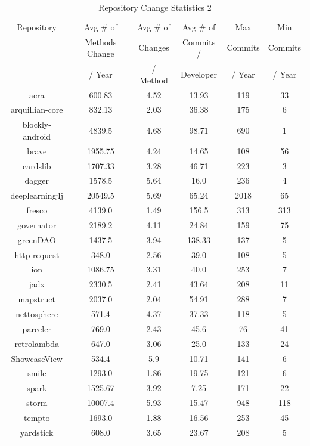 \begin{table}
\begin{center}
    \begin{tabular}{|c|c|c|c|c|c|}
        \hline
        Repository & Avg \# of & Avg \# of & Avg \# of & Max & Min \\
         & Methods Change & Changes & Commits / & Commits & Commits \\
         & / Year & / Method & Developer & / Year & / Year \\
        \hline
        acra & 600.83 & 4.52 & 13.93 & 119 & 33 \\
        arquillian-core & 832.13 & 2.03 & 36.38 & 175 & 6 \\
        blockly-android & 4839.5 & 4.68 & 98.71 & 690 & 1 \\
        brave & 1955.75 & 4.24 & 14.65 & 108 & 56 \\
        cardslib & 1707.33 & 3.28 & 46.71 & 223 & 3 \\
        dagger & 1578.5 & 5.64 & 16.0 & 236 & 4 \\
        deeplearning4j & 20549.5 & 5.69 & 65.24 & 2018 & 65 \\
        fresco & 4139.0 & 1.49 & 156.5 & 313 & 313 \\
        governator & 2189.2 & 4.11 & 24.84 & 159 & 75 \\
        greenDAO & 1437.5 & 3.94 & 138.33 & 137 & 5 \\
        http-request & 348.0 & 2.56 & 39.0 & 108 & 5 \\
        ion & 1086.75 & 3.31 & 40.0 & 253 & 7 \\
        jadx & 2330.5 & 2.41 & 43.64 & 208 & 11 \\
        mapstruct & 2037.0 & 2.04 & 54.91 & 288 & 7 \\
        nettosphere & 571.4 & 4.37 & 37.33 & 118 & 5 \\
        parceler & 769.0 & 2.43 & 45.6 & 76 & 41 \\
        retrolambda & 647.0 & 3.06 & 25.0 & 133 & 24 \\
        ShowcaseView & 534.4 & 5.9 & 10.71 & 141 & 6 \\
        smile & 1293.0 & 1.86 & 19.75 & 121 & 6 \\
        spark & 1525.67 & 3.92 & 7.25 & 171 & 22 \\
        storm & 10007.4 & 5.93 & 15.47 & 948 & 118 \\
        tempto & 1693.0 & 1.88 & 16.56 & 253 & 45 \\
        yardstick & 608.0 & 3.65 & 23.67 & 208 & 5 \\
        \hline
    \end{tabular}
\end{center}
\caption{Repository Change Statistics 2}
\label{tab:repository_stats_2}
\end{table}

